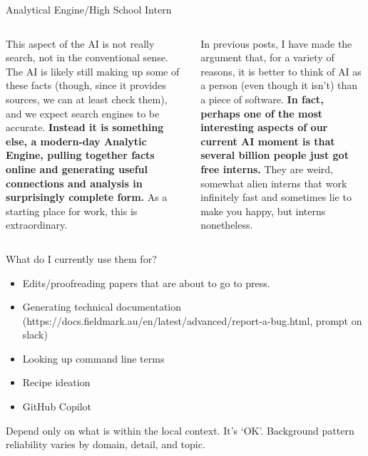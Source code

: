 \documentclass[aspectratio=169]{beamer}
\begin{document}
\begin{frame}{Analytical Engine/High School Intern}
\begin{columns}[t]
    \begin{column}{.5\textwidth}
        This aspect of the AI is not really search, not in the conventional sense. The AI is likely still making up some of these facts (though, since it provides sources, we can at least check them), and we expect search engines to be accurate. \textbf{Instead it is something else, a modern-day Analytic Engine, pulling together facts online and generating useful connections and analysis in surprisingly complete form.} As a starting place for work, this is extraordinary. \parencite{Mollick2023-sj}
    \end{column}
    \begin{column}{.5\textwidth}
        In previous posts, I have made the argument that, for a variety of reasons, it is better to think of AI as a person (even though it isn’t) than a piece of software. \textbf{In fact, perhaps one of the most interesting aspects of our current AI moment is that several billion people just got free interns.} They are weird, somewhat alien interns that work infinitely fast and sometimes lie to make you happy, but interns nonetheless. \parencite{Mollick2023-il}
    \end{column}
\end{columns}
    
		
\end{frame}


\begin{frame}{What do I currently use them for?}
    \begin{itemize}
        \item Edits/proofreading papers that are about to go to press.
	\item Generating technical documentation (https://docs.fieldmark.au/en/latest/advanced/report-a-bug.html, prompt on slack)
	\item Looking up command line terms
        \item Recipe ideation
        \item GitHub Copilot
    \end{itemize}
\vspace{1em}
{\Large Depend only on what is within the local context. It's `OK'. Background pattern reliability varies by domain, detail, and topic.}
		
\end{frame}
\end{document}
